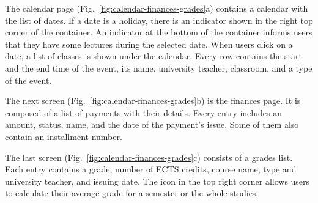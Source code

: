 The calendar page (Fig.~\ref{fig:calendar-finances-grades}a) contains a calendar with the list of dates. If a date is a holiday, there is an indicator shown in the right top corner of the container. An indicator at the bottom of the container informs users that they have some lectures during the selected date.
When users click on a date, a list of classes is shown under the calendar. Every row contains the start and the end time of the event, its name, university teacher, classroom, and a type of the event.

The next screen (Fig.~\ref{fig:calendar-finances-grades}b) is the finances page. It is composed of a list of payments with their details. Every entry includes an amount, status, name, and the date of the payment's issue. Some of them also contain an installment number.

The last screen (Fig.~\ref{fig:calendar-finances-grades}c) consists of a grades list. Each entry contains a grade, number of ECTS credits, course name, type and university teacher, and issuing date. The icon in the top right corner allows users to calculate their average grade for a semester or the whole studies.

